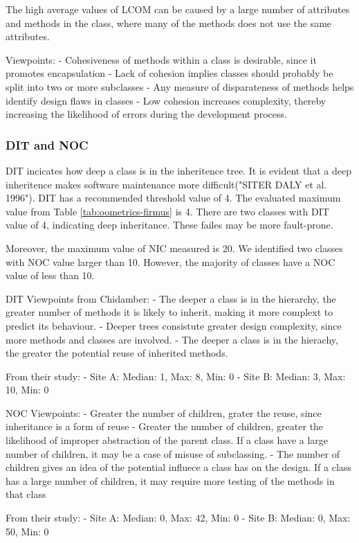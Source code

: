 The high average values of LCOM can be caused by a large number of attributes and methods in the class, where many of the methods does not use the same attributes.

Viewpoints: 
- Cohesiveness of methods within a class is desirable, since it promotes encapsulation
- Lack of cohesion implies classes should probably be split into two or more subclasses
- Any measure of disparateness of methods helps identify design flaws in classes
- Low cohesion increases complexity, thereby increasing the likelihood of errors during the development process.


\subsubsection{DIT and NOC}
DIT incicates how deep a class is in the inheritence tree. It is evident that a deep inheritence makes software maintenance more difficult("SITER DALY et al. 1996"). DIT has a recommended threshold value of 4. The evaluated maximum value from Table \ref{tab:oometrics-firmus} is 4. There are two classes with DIT value of 4, indicating deep inheritance. These failes may be more fault-prone.

Moreover, the maximum value of NIC measured is 20. We identified two classes with NOC value larger than 10. However, the majority of classes have a NOC value of less than 10.

DIT Viewpoints from Chidamber:
- The deeper a class is in the hierarchy, the greater number of methods it is likely to inherit, making it more complext to predict its behaviour. 
- Deeper trees consistute greater design complexity, since more methods and classes are involved.
- The deeper a class is in the hierachy, the greater the potential reuse of inherited methods.

From their study:
- Site A: Median: 1, Max: 8, Min: 0
- Site B: Median: 3, Max: 10, Min: 0


NOC Viewpoints:
- Greater the number of children, grater the reuse, since inheritance is a form of reuse
- Greater the number of children, greater the likelihood of improper abstraction of the parent class. If a class have a large number of children, it may be a case of misuse of subclassing.
- The number of children gives an idea of the potential influece a class has on the design. If a class has a large number of children, it may require more testing of the methods in that class

From their study:
- Site A: Median: 0, Max: 42, Min: 0
- Site B: Median: 0, Max: 50, Min: 0

